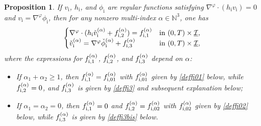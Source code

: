 \documentclass[JEP,XML,SOM,Unicode,NoFloatCountersInSection,published]{cedram}
\newcommand{\cI}{{\mathcal I}}
\newcommand{\ul}[1]{\underline{#1}}
\newtheorem{proposition}[theorem]{Proposition}
\theoremstyle{definition}
\begin{document}
\begin{proposition}\label{propGUinterior}
If $v_\mathrm{i}$, $h_\mathrm{i}$, and $\phi_\mathrm{i}$ are regular functions satisfying $\nabla^\varphi\cdot (h_\mathrm{i}v_\mathrm{i})=0$ and
$v_\mathrm{i}=\nabla^\varphi \phi_\mathrm{i}$, then for any nonzero multi-index $\alpha\in {\mathbb N}^3$, one has
\begin{equation}\label{QLSWEi}
\begin{cases}
\nabla^\varphi\cdot(h_\mathrm{i}\check{v}_\mathrm{i}^{(\alpha)}+f_{{\rm i},2}^{(\alpha)}) = f_{{\rm i},1}^{(\alpha)} &\text{in } (0,T)\times\ul{\cI}, \\
\check{v}_\mathrm{i}^{(\alpha)} = \nabla^\varphi \check{\phi}_\mathrm{i}^{(\alpha)}+f_{{\rm i},3}^{(\alpha)} &\text{in } (0,T)\times\ul{\cI},
\end{cases}
\end{equation}
where the expressions for $f_{{\rm i},1}^{(\alpha)}$, $f_{{\rm i},2}^{(\alpha)}$, and $f_{{\rm i},3}^{(\alpha)}$ depend on $\alpha$:
\begin{itemize}
\item
If $\alpha_1+\alpha_2\geq 1$,
then $f_{{\rm i},1}^{(\alpha)}=f_{{\rm i},01}^{(\alpha)} $ with $f_{{\rm i},01}^{(\alpha)} $ given by \eqref{deffi01} below,
while $f_{{\rm i},2}^{(\alpha)}=0$, and $f_{{\rm i},3}^{(\alpha)}$ is given by \eqref{deffi3} and subsequent explanation below;
\item
If $\alpha_1=\alpha_2=0$,
then $f_{{\rm i},1}^{(\alpha)}=0 $ and $f_{{\rm i},2}^{(\alpha)}=f_{{\rm i},02}^{(\alpha)} $ with $f_{{\rm i},02}^{(\alpha)} $ given by \eqref{deffi02} below,
while $f_{{\rm i},3}^{(\alpha)}$ is given by \eqref{deffi3bis} below.
\end{itemize}
\end{proposition}
\end{document}
